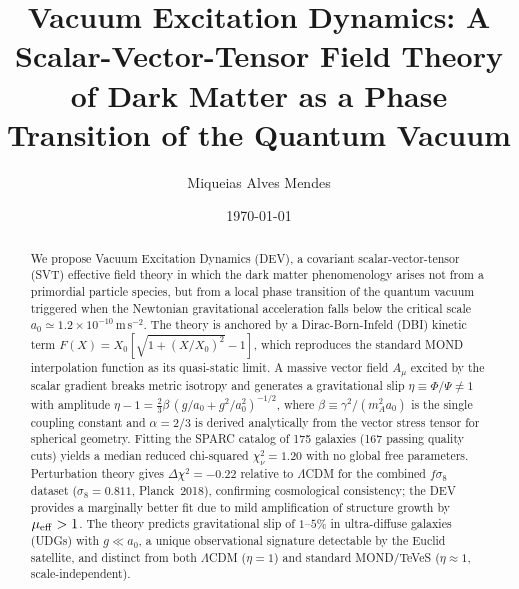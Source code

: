 \documentclass[aps,prd,twocolumn,showpacs,superscriptaddress]{revtex4-2}
\newcommand{\aO}{a_0}
\newcommand{\LCDM}{$\Lambda$CDM}
\begin{document}
\title{Vacuum Excitation Dynamics: A Scalar-Vector-Tensor Field Theory
       of Dark Matter as a Phase Transition of the Quantum Vacuum}

\author{Miqueias Alves Mendes}

\date{\today}

\begin{abstract}
We propose Vacuum Excitation Dynamics (DEV), a covariant
scalar-vector-tensor (SVT) effective field theory in which the dark
matter phenomenology arises not from a primordial particle species,
but from a local phase transition of the quantum vacuum triggered when
the Newtonian gravitational acceleration falls below the critical scale
$\aO \simeq 1.2\times10^{-10}$\,m\,s$^{-2}$.
The theory is anchored by a Dirac-Born-Infeld (DBI) kinetic term
$F(X) = X_0[\sqrt{1+(X/X_0)^2}-1]$,
which reproduces the standard MOND interpolation function as its
quasi-static limit.
A massive vector field $A_\mu$ excited by the scalar gradient breaks
metric isotropy and generates a gravitational slip
$\eta \equiv \Phi/\Psi \neq 1$ with amplitude
$\eta - 1 = \frac{2}{3}\beta\,(g/\aO+g^2/\aO^2)^{-1/2}$,
where $\beta \equiv \gamma^2/(m_A^2 \aO)$ is the single coupling constant
and $\alpha = 2/3$ is derived analytically from the vector stress tensor
for spherical geometry.
Fitting the SPARC catalog of 175 galaxies (167 passing quality cuts)
yields a median reduced chi-squared $\chi^2_\nu = 1.20$
with no global free parameters.
Perturbation theory gives $\Delta\chi^2 = -0.22$ relative to \LCDM{}
for the combined $f\sigma_8$ dataset ($\sigma_8 = 0.811$, Planck~2018),
confirming cosmological consistency; the DEV provides a marginally
better fit due to mild amplification of structure growth by
$\mu_{\rm eff} > 1$.
The theory predicts gravitational slip of $1$--$5\%$ in
ultra-diffuse galaxies (UDGs) with $g \ll \aO$, a unique
observational signature detectable by the Euclid satellite,
and distinct from both \LCDM{} ($\eta=1$) and
standard MOND/TeVeS ($\eta\approx 1$, scale-independent).
\end{abstract}


\maketitle
\end{document}
